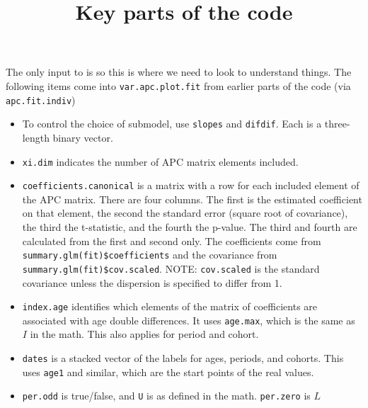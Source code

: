 \documentclass{article}
\title{Key parts of the code}
\begin{document}
\maketitle

The only input to  is  so this is where we need to look to understand things.
The following items come into \texttt{var.apc.plot.fit} from earlier parts of the code (via \texttt{apc.fit.indiv})
\begin{itemize}
\item To control the choice of submodel, use \texttt{slopes} and \texttt{difdif}. Each is a three-length binary vector.
\item \texttt{xi.dim} indicates the number of APC matrix elements included.
\item \texttt{coefficients.canonical} is a matrix with a row for each included element of the APC matrix. There are four columns. The first is the estimated coefficient on that element, the second the standard error (square root of covariance), the third the t-statistic, and the fourth the p-value. The third and fourth are calculated from the first and second only. The coefficients come from \texttt{summary.glm(fit)\$coefficients} and the covariance from \texttt{summary.glm(fit)\$cov.scaled}. NOTE: \texttt{cov.scaled} is the standard covariance unless the dispersion is specified to differ from 1.
\item \texttt{index.age} identifies which elements of the matrix of coefficients are associated with age double differences. It uses \texttt{age.max}, which is the same as $I$ in the math. This also applies for period and cohort.
\item \texttt{dates} is a stacked vector of the labels for ages, periods, and cohorts. This uses \texttt{age1} and similar, which are the start points of the real values.
\item \texttt{per.odd} is true/false, and \texttt{U} is as defined in the math. \texttt{per.zero} is $L$
\end{itemize}
\end{document}
